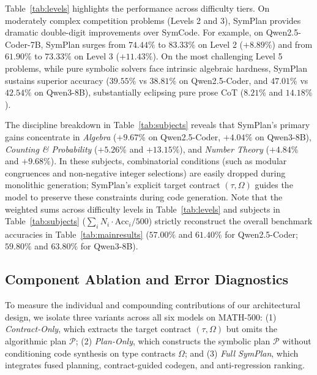 \documentclass[runningheads]{llncs}
\begin{document}
Table~\ref{tab:levels} highlights the performance across difficulty tiers. On moderately complex competition problems (Levels 2 and 3), SymPlan provides dramatic double-digit improvements over SymCode. For example, on Qwen2.5-Coder-7B, SymPlan surges from $74.44\%$ to $83.33\%$ on Level 2 ($+8.89\%$) and from $61.90\%$ to $73.33\%$ on Level 3 ($+11.43\%$). On the most challenging Level 5 problems, while pure symbolic solvers face intrinsic algebraic hardness, SymPlan sustains superior accuracy ($39.55\%$ vs $38.81\%$ on Qwen2.5-Coder, and $47.01\%$ vs $42.54\%$ on Qwen3-8B), substantially eclipsing pure prose CoT ($8.21\%$ and $14.18\%$).

The discipline breakdown in Table~\ref{tab:subjects} reveals that SymPlan's primary gains concentrate in \textit{Algebra} ($+9.67\%$ on Qwen2.5-Coder, $+4.04\%$ on Qwen3-8B), \textit{Counting \& Probability} ($+5.26\%$ and $+13.15\%$), and \textit{Number Theory} ($+4.84\%$ and $+9.68\%$). In these subjects, combinatorial conditions (such as modular congruences and non-negative integer selections) are easily dropped during monolithic generation; SymPlan's explicit target contract $(\tau, \Omega)$ guides the model to preserve these constraints during code generation. Note that the weighted sums across difficulty levels in Table~\ref{tab:levels} and subjects in Table~\ref{tab:subjects} ($\sum_i N_i \cdot \text{Acc}_i / 500$) strictly reconstruct the overall benchmark accuracies in Table~\ref{tab:mainresults} ($57.00\%$ and $61.40\%$ for Qwen2.5-Coder; $59.80\%$ and $63.80\%$ for Qwen3-8B).

\subsection{Component Ablation and Error Diagnostics}
\label{sec:ablation}

To measure the individual and compounding contributions of our architectural design, we isolate three variants across all six models on MATH-500: (1) \textit{Contract-Only}, which extracts the target contract $(\tau, \Omega)$ but omits the algorithmic plan $\mathcal{P}$; (2) \textit{Plan-Only}, which constructs the symbolic plan $\mathcal{P}$ without conditioning code synthesis on type contracts $\Omega$; and (3) \textit{Full SymPlan}, which integrates fused planning, contract-guided codegen, and anti-regression ranking.
\end{document}
